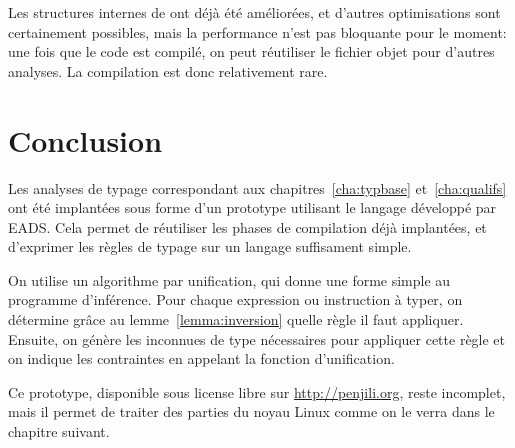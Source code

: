 Les structures internes de \ctonewspeak ont déjà été améliorées, et d'autres
optimisations sont certainement possibles, mais la performance n'est pas
bloquante pour le moment: une fois que le code est compilé, on peut réutiliser
le fichier objet \newspeak pour d'autres analyses. La compilation est donc
relativement rare.

\section*{Conclusion}

Les analyses de typage correspondant aux chapitres~\ref{cha:typbase}
et~\ref{cha:qualifs} ont été implantées sous forme d'un prototype utilisant le
langage \newspeak développé par EADS. Cela permet de réutiliser les phases de
compilation déjà implantées, et d'exprimer les règles de typage sur un langage
suffisament simple.

On utilise un algorithme par unification, qui donne une forme simple au
programme d'inférence. Pour chaque expression ou instruction à typer, on
détermine grâce au lemme~\ref{lemma:inversion} quelle règle il faut appliquer.
Ensuite, on génère les inconnues de type nécessaires pour appliquer cette règle
et on indique les contraintes en appelant la fonction d'unification.

Ce prototype, disponible sous license libre sur \url{http://penjili.org}, reste
incomplet, mais il permet de traiter des parties du noyau Linux comme on le
verra dans le chapitre suivant.

